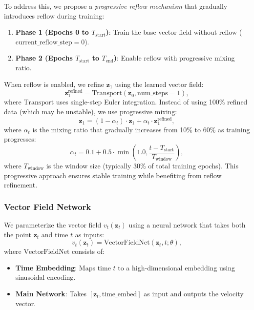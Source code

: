 \documentclass[sigconf]{acmart}
\begin{document}
To address this, we propose a \textit{progressive reflow mechanism} that gradually introduces reflow during training:
\begin{enumerate}[leftmargin=*]
\item \textbf{Phase 1 (Epochs 0 to $T_{\text{start}}$)}: Train the base vector field without reflow ($\text{current\_reflow\_step} = 0$).
\item \textbf{Phase 2 (Epochs $T_{\text{start}}$ to $T_{\text{end}}$)}: Enable reflow with progressive mixing ratio.
\end{enumerate}

When reflow is enabled, we refine $\mathbf z_1$ using the learned vector field:
\begin{equation}
\label{reflow_refine}
\mathbf z_1^{\text{refined}} = \text{Transport}(\mathbf z_0, \text{num\_steps}=1),
\end{equation}
where $\text{Transport}$ uses single-step Euler integration. Instead of using 100\% refined data (which may be unstable), we use progressive mixing:
\begin{equation}
\label{progressive_mixing}
\mathbf z_1 = (1 - \alpha_t) \cdot \mathbf z_1 + \alpha_t \cdot \mathbf z_1^{\text{refined}},
\end{equation}
where $\alpha_t$ is the mixing ratio that gradually increases from 10\% to 60\% as training progresses:
\begin{equation}
\label{mixing_ratio}
\alpha_t = 0.1 + 0.5 \cdot \min\left(1.0, \frac{t - T_{\text{start}}}{T_{\text{window}}}\right),
\end{equation}
where $T_{\text{window}}$ is the window size (typically 30\% of total training epochs). This progressive approach ensures stable training while benefiting from reflow refinement.

\subsubsection{\textbf{Vector Field Network}}
We parameterize the vector field $v_t(\mathbf z_t)$ using a neural network that takes both the point $\mathbf z_t$ and time $t$ as inputs:
\begin{equation}
\label{vector_field}
v_t(\mathbf z_t) = \text{VectorFieldNet}(\mathbf z_t, t; \theta),
\end{equation}
where $\text{VectorFieldNet}$ consists of:
\begin{itemize}[leftmargin=*]
\item \textbf{Time Embedding}: Maps time $t$ to a high-dimensional embedding using sinusoidal encoding.
\item \textbf{Main Network}: Takes $[\mathbf z_t, \text{time\_embed}]$ as input and outputs the velocity vector.
\end{itemize}
\end{document}
